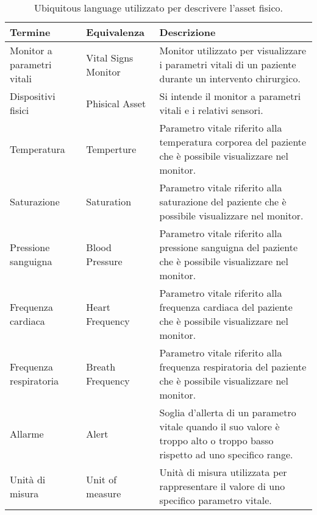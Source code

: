\bgroup
\def\arraystretch{1.5}
\begin{table}[H]
    \begin{tabular}{ |m{3cm}|m{3cm}|m{5cm}| } 
        \hline
        \textbf{Termine} & \textbf{Equivalenza} & \textbf{Descrizione}
        \\\hline
        Monitor a parametri vitali & Vital Signs Monitor & Monitor utilizzato per visualizzare i parametri vitali di un paziente durante un intervento chirurgico.
        \\\hline
        Dispositivi fisici &  Phisical Asset & Si intende il monitor a parametri vitali e i relativi sensori.
        \\\hline
        Temperatura & Temperture & Parametro vitale riferito alla temperatura corporea del paziente che è possibile visualizzare nel monitor.
        \\\hline
        Saturazione & Saturation & Parametro vitale riferito alla saturazione del paziente che è possibile visualizzare nel monitor.
        \\\hline
        Pressione sanguigna & Blood Pressure & Parametro vitale riferito alla pressione sanguigna del paziente che è possibile visualizzare nel monitor.
        \\\hline
        Frequenza cardiaca & Heart Frequency & Parametro vitale riferito alla frequenza cardiaca  del paziente che è possibile visualizzare nel monitor.
        \\\hline
        Frequenza respiratoria & Breath Frequency  & Parametro vitale riferito alla frequenza respiratoria del paziente che è possibile visualizzare nel monitor.
        \\\hline
        Allarme &  Alert & Soglia d'allerta di un parametro vitale quando il suo valore è troppo alto o troppo basso rispetto ad uno specifico range.
        \\\hline
        Unità di misura & Unit of measure & Unità di misura utilizzata per rappresentare il valore di uno specifico parametro vitale.
        \\\hline
    \end{tabular}
    \caption{\label{tab:phisical-asset-ubiquitous-language-table}Ubiquitous language utilizzato per descrivere l'asset fisico.}
\end{table}
\egroup


